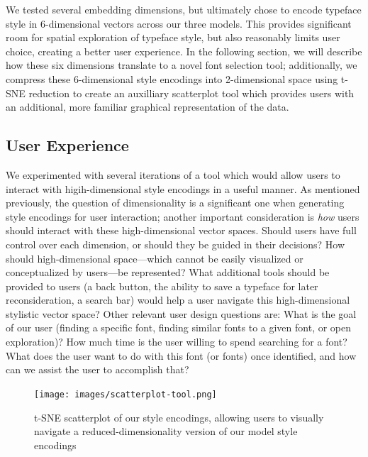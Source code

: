 We tested several embedding dimensions, but ultimately chose to encode typeface style in 6-dimensional vectors across our three models. This provides significant room for spatial exploration of typeface style, but also reasonably limits user choice, creating a better user experience. In the following section, we will describe how these six dimensions translate to a novel font selection tool; additionally, we compress these 6-dimensional style encodings into 2-dimensional space using t-SNE reduction to create an auxilliary scatterplot tool which provides users with an additional, more familiar graphical representation of the data.

\subsection{User Experience}

We experimented with several iterations of a tool which would allow users to interact with higih-dimensional style encodings in a useful manner. As mentioned previously, the question of dimensionality is a significant one when generating style encodings for user interaction; another important consideration is \textit{how} users should interact with these high-dimensional vector spaces. Should users have full control over each dimension, or should they be guided in their decisions? How should high-dimensional space—which cannot be easily visualized or conceptualized by users—be represented? What additional tools should be provided to users (a back button, the ability to save a typeface for later reconsideration, a search bar) would help a user navigate this high-dimensional stylistic vector space? Other relevant user design questions are: What is the goal of our user (finding a specific font, finding similar fonts to a given font, or open exploration)? How much time is the user willing to spend searching for a font? What does the user want to do with this font (or fonts) once identified, and how can we assist the user to accomplish that?

\begin{figure}[h]
    \centering
    \texttt{[image: images/scatterplot-tool.png]}
    \caption{t-SNE scatterplot of our style encodings, allowing users to visually navigate a reduced-dimensionality version of our model style encodings}
    \label{fig:scatterplot-tool}
\end{figure}

